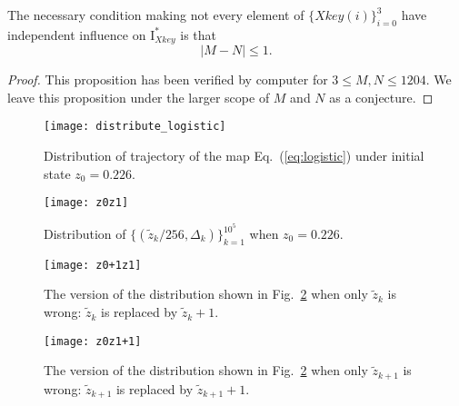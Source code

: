 \documentclass[twocolumn]{svjour3}
\newcommand\mymatrix[1]{\bm{\mathrm{#1}}}
\newlength\imagewidth
\newcommand\Xkey{\textit{Xkey}}
\begin{document}
\begin{proposition}
The necessary condition making not every element of $\{\textit{Xkey}(i)\}_{i=0}^3$
have independent influence on $\mymatrix{I}_{\Xkey}^*$
is that
\begin{equation}
|M-N|\leq 1.
\end{equation}
\label{prop:condition}
\end{proposition}
\begin{proof}
This proposition has been verified by computer for $3\leq M, N\leq 1204$. We leave
this proposition under the larger scope of $M$ and $N$ as a conjecture.
\end{proof}

\begin{figure}[!htb]
\centering
\begin{minipage}[t]{\imagewidth}
\centering
\texttt{[image: distribute\_logistic]}
\end{minipage}
\caption{Distribution of trajectory of the map Eq.~(\ref{eq:logistic}) under initial state $z_0=0.226$.}
\label{fig:distribute4logistic}
\end{figure}

\begin{figure}[!htb]
\centering
\begin{minipage}[t]{\imagewidth}
\centering
\texttt{[image: z0z1]}
\end{minipage}
\caption{Distribution of  $\{(\tilde{z}_{k}/256, \Delta_k)\}_{k=1}^{10^5}$ when $z_0=0.226$.}
\label{fig:z0z1}
\end{figure}

\begin{figure}[!htb]
\centering
\begin{minipage}[t]{\imagewidth}
\centering
\texttt{[image: z0+1z1]}
\end{minipage}
\caption{The version of the distribution shown in Fig.~\ref{fig:z0z1} when only $\tilde{z}_{k}$ is wrong: $\tilde{z}_{k}$ is replaced by $\tilde{z}_{k}+1$.}
\label{fig:z0+1z1}
\end{figure}

\begin{figure}[!htb]
\centering
\begin{minipage}[t]{\imagewidth}
\centering
\texttt{[image: z0z1+1]}
\end{minipage}
\caption{The version of the distribution shown in Fig.~\ref{fig:z0z1} when only $\tilde{z}_{k+1}$
is wrong: $\tilde{z}_{k+1}$ is replaced by $\tilde{z}_{k+1}+1$.
}
\label{fig:z0z1+1}
\end{figure}
\end{document}
